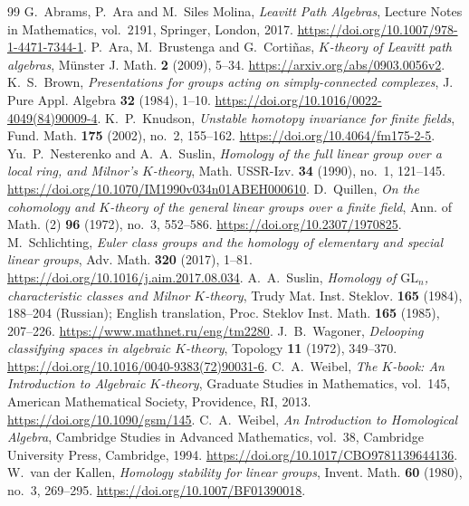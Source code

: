 \documentclass[10pt,a4paper]{amsart}
\numberwithin{equation}{section}
\begin{document}
\begin{thebibliography}{99}
 G.~Abrams, P.~Ara and M.~Siles Molina, \emph{Leavitt Path Algebras}, Lecture Notes in Mathematics, vol.~2191, Springer, London, 2017. \url{https://doi.org/10.1007/978-1-4471-7344-1}.
 P.~Ara, M.~Brustenga and G.~Corti\~nas, \emph{$K$-theory of Leavitt path algebras}, M\"unster J. Math. \textbf{2} (2009), 5--34. \url{https://arxiv.org/abs/0903.0056v2}.
 K.~S.~Brown, \emph{Presentations for groups acting on simply-connected complexes}, J. Pure Appl. Algebra \textbf{32} (1984), 1--10. \url{https://doi.org/10.1016/0022-4049(84)90009-4}.
 K.~P.~Knudson, \emph{Unstable homotopy invariance for finite fields}, Fund. Math. \textbf{175} (2002), no.~2, 155--162. \url{https://doi.org/10.4064/fm175-2-5}.
 Yu.~P.~Nesterenko and A.~A.~Suslin, \emph{Homology of the full linear group over a local ring, and Milnor's $K$-theory}, Math. USSR-Izv. \textbf{34} (1990), no.~1, 121--145. \url{https://doi.org/10.1070/IM1990v034n01ABEH000610}.
 D.~Quillen, \emph{On the cohomology and $K$-theory of the general linear groups over a finite field}, Ann. of Math. (2) \textbf{96} (1972), no.~3, 552--586. \url{https://doi.org/10.2307/1970825}.
 M.~Schlichting, \emph{Euler class groups and the homology of elementary and special linear groups}, Adv. Math. \textbf{320} (2017), 1--81. \url{https://doi.org/10.1016/j.aim.2017.08.034}.
 A.~A.~Suslin, \emph{Homology of $\mathrm{GL}_n$, characteristic classes and Milnor $K$-theory}, Trudy Mat. Inst. Steklov. \textbf{165} (1984), 188--204 (Russian); English translation, Proc. Steklov Inst. Math. \textbf{165} (1985), 207--226. \url{https://www.mathnet.ru/eng/tm2280}.
 J.~B.~Wagoner, \emph{Delooping classifying spaces in algebraic $K$-theory}, Topology \textbf{11} (1972), 349--370. \url{https://doi.org/10.1016/0040-9383(72)90031-6}.
 C.~A.~Weibel, \emph{The $K$-book: An Introduction to Algebraic $K$-theory}, Graduate Studies in Mathematics, vol.~145, American Mathematical Society, Providence, RI, 2013. \url{https://doi.org/10.1090/gsm/145}.
 C.~A.~Weibel, \emph{An Introduction to Homological Algebra}, Cambridge Studies in Advanced Mathematics, vol.~38, Cambridge University Press, Cambridge, 1994. \url{https://doi.org/10.1017/CBO9781139644136}.
 W.~van der Kallen, \emph{Homology stability for linear groups}, Invent. Math. \textbf{60} (1980), no.~3, 269--295. \url{https://doi.org/10.1007/BF01390018}.
\end{thebibliography}
\end{document}
